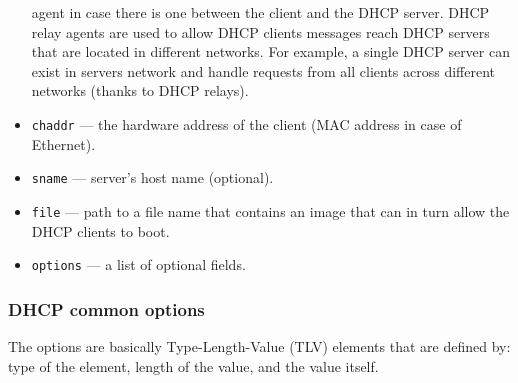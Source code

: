 \documentclass[pdftex,12pt,a4paper]{article}
\begin{document}
\begin{itemize}
                        agent in case there is one between the client and the
                        DHCP server. DHCP relay agents are used to allow DHCP
                        clients messages reach DHCP servers that are located in
                        different networks. For example, a single DHCP server
                        can exist in servers network and handle requests from
                        all clients across different networks (thanks to DHCP
                        relays).
                    \item \texttt{chaddr} --- the hardware address of the
                        client (MAC address in case of Ethernet).
                    \item \texttt{sname} --- server's host name (optional).
                    \item \texttt{file} --- path to a file name that contains
                        an image that can in turn allow the DHCP clients to
                        boot.
                    \item \texttt{options} --- a list of optional fields.
                \end{itemize}

            \subsubsection{DHCP common options}
                The options are basically Type-Length-Value (TLV) elements that
                are defined by: type of the element, length of the value, and
                the value itself.
\end{document}
